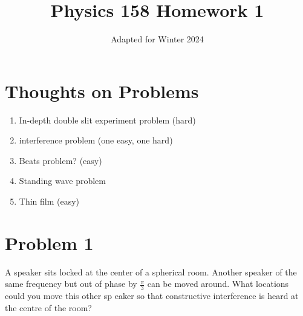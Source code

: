 \documentclass[11pt, fleqn]{article}
\title{Physics 158 Homework 1}
\author{}
\date{Adapted for Winter 2024}
\begin{document}
\allowdisplaybreaks

\maketitle

\section*{Thoughts on Problems}
\begin{enumerate}
    \item In-depth double slit experiment problem (hard)
    \item interference problem (one easy, one hard)
    \item Beats problem? (easy)
    \item Standing wave problem
    \item Thin film (easy)
\end{enumerate}

\section*{Problem 1}
A speaker sits locked at the center of a spherical room. Another speaker
of the same frequency but out of phase by $\frac{\pi}{3}$ can be moved around. 
What locations could you move this other sp
eaker so that constructive interference is
heard at the centre of the room?
\end{document}
